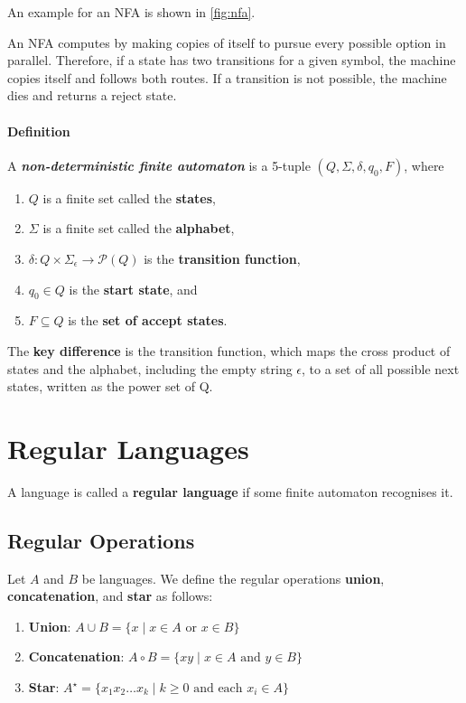 An example for an NFA is shown in \autoref{fig:nfa}.

An NFA computes by making copies of itself to pursue every possible option in parallel. Therefore, if a state has two transitions for a given symbol, the machine copies itself and follows both routes. If a transition is not possible, the machine dies and returns a reject state.

\paragraph{Definition} A \textbf{\emph{non-deterministic finite automaton} }  is a 5-tuple \( (Q, \Sigma, \delta, q_0, F) \), where

\begin{enumerate}
	\item \( Q \) is a finite set called the \textbf{states},
	\item \( \Sigma \) is a finite set called the \textbf{alphabet},
	\item \( \delta: Q \times \Sigma_\epsilon \rightarrow \mathcal{P}(Q) \) is the \textbf{transition function},
	\item \( q_0 \in Q \) is the \textbf{start state}, and
	\item \( F \subseteq Q \) is the \textbf{set of accept states}.    
\end{enumerate}

The \textbf{key difference} is the transition function, which maps the cross product of states and the alphabet, including the empty string \( \epsilon \), to a set of all possible next states, written as the power set of Q.

\section{Regular Languages}
A language is called a \textbf{regular language} if some finite automaton recognises it.

\subsection{Regular Operations}
Let \( A \) and \( B \) be languages. We define the regular operations \textbf{union}, \textbf{concatenation}, and \textbf{star} as follows:
\begin{enumerate}
	\item \textbf{Union}: \( A \cup B = \{x \mid x \in A \textrm{ or } x \in B \} \)
	\item \textbf{Concatenation}: \( A \circ B = \{xy \mid x \in A \textrm{ and } y \in B \} \)
	\item \textbf{Star}: \( A^{\star} = \{ x_1 x_2 \ldots x_k \mid k \geq 0 \textrm{ and each } x_i \in A\} \)  
\end{enumerate}

